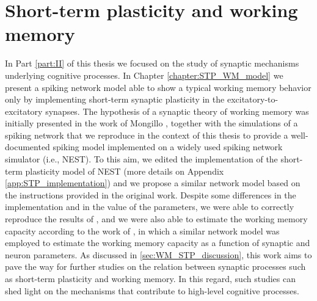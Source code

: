 \documentclass[a4paper, 12pt, twoside, openright]{book}
\begin{document}
\section*{Short-term plasticity and working memory}

In Part \ref{part:II} of this thesis we focused on the study of synaptic mechanisms underlying cognitive processes. In Chapter \ref{chapter:STP_WM_model} we present a spiking network model able to show a typical working memory behavior only by implementing short-term synaptic plasticity in the excitatory-to-excitatory synapses. The hypothesis of a synaptic theory of working memory was initially presented in the work of Mongillo \cite{Mongillo2008}, together with the simulations of a spiking network that we reproduce in the context of this thesis to provide a well-documented spiking model implemented on a widely used spiking network simulator (i.e., NEST). To this aim, we edited the implementation of the short-term plasticity model of NEST (more details on Appendix \ref{app:STP_implementation}) and we propose a similar network model based on the instructions provided in the original work. Despite some differences in the implementation and in the value of the parameters, we were able to correctly reproduce the results of \cite{Mongillo2008}, and we were also able to estimate the working memory capacity according to the work of \cite{mi_katkov_tsodyks2017}, in which a similar network model was employed to estimate the working memory capacity as a function of synaptic and neuron parameters. As discussed in \ref{sec:WM_STP_discussion}, this work aims to pave the way for further studies on the relation between synaptic processes such as short-term plasticity and working memory. In this regard, such studies can shed light on the mechanisms that contribute to high-level cognitive processes.
\end{document}
